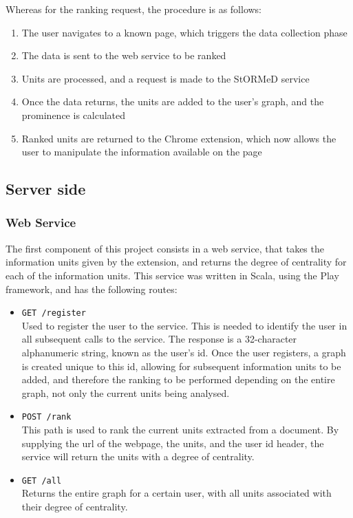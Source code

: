 \noindent Whereas for the ranking request, the procedure is as follows:
\begin{enumerate}
\item The user navigates to a known page, which triggers the data collection phase
\item The data is sent to the web service to be ranked
\item Units are processed, and a request is made to the StORMeD service
\item Once the data returns, the units are added to the user's graph, and the prominence is calculated
\item Ranked units are returned to the Chrome extension, which now allows the user to manipulate the information available on the page
\end{enumerate}

\subsection{Server side}
\subsubsection{Web Service}
The first component of this project consists in a web service, that takes the information units given by the extension, and returns the degree of centrality for each of the information units. This service was written in Scala, using the Play framework, and has the following routes:

\begin{itemize}
\item \texttt{GET /register}\\
Used to register the user to the service. This is needed to identify the user in all subsequent calls to the service. The response is a 32-character alphanumeric string, known as the user's id. Once the user registers, a graph is created unique to this id, allowing for subsequent information units to be added, and therefore the ranking to be performed depending on the entire graph, not only the current units being analysed.
\item \texttt{POST /rank}\\
This path is used to rank the current units extracted from a document. By supplying the url of the webpage, the units, and the user id header, the service will return the units with a degree of centrality. 
\item \texttt{GET /all}\\
Returns the entire graph for a certain user, with all units associated with their degree of centrality.
\end{itemize}



